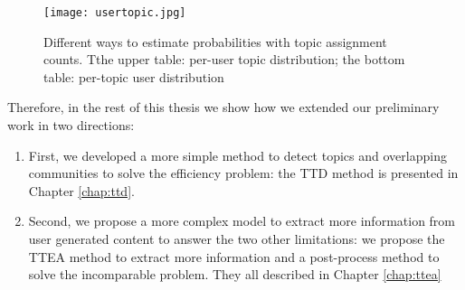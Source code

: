 \begin{itemize}
\end{itemize}

\begin{figure}
\centering
\texttt{[image: usertopic.jpg]}  
\caption{Different ways to estimate probabilities with topic assignment counts. Tthe upper table: per-user topic distribution; the bottom table: per-topic user distribution}
\label{fig:usertopic} 
\end{figure}


Therefore, in the rest of this thesis we show how we extended our preliminary work in two directions:

\begin{enumerate}
 \item First, we developed a more simple method to detect topics and overlapping communities to solve the efficiency problem: the TTD method is presented in Chapter \ref{chap:ttd}.
  \item Second, we propose a more complex model to extract more information from user generated content to answer the two other limitations: we propose the TTEA method to extract more information and a post-process method to solve the incomparable problem. They all described in Chapter \ref{chap:ttea}
\end{enumerate}
 
